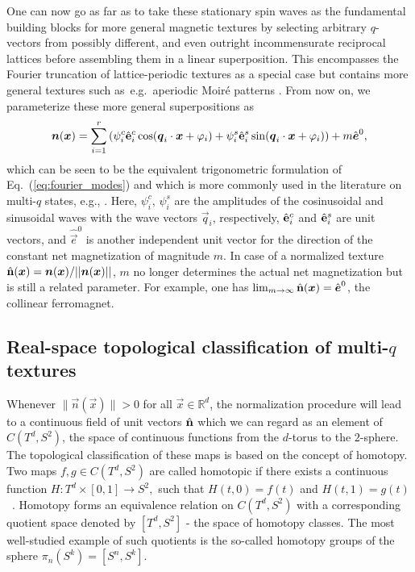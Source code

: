 \documentclass[submission, Phys]{SciPost}
\begin{document}
One can now go as far as to take these stationary spin waves as the fundamental building blocks for more general magnetic textures by selecting arbitrary $q$-vectors from possibly different, and even outright incommensurate reciprocal lattices before assembling them in a linear superposition.
This encompasses the Fourier truncation of lattice-periodic textures as a special case but contains more general textures such as~e.g.~aperiodic Moir\'e patterns \cite{Shimizu2021}.
From now on, we parameterize these more general superpositions as
\begin{equation}
    \boldsymbol{n}(\boldsymbol{x})=\sum_{i=1}^r \left(\psi_i^c \hat{\mathbf{e}}_i^c \cos(\boldsymbol{q}_i\cdot\boldsymbol{x}+\varphi_i) + \psi_i^s \hat{\mathbf{e}}_i^s \sin(\boldsymbol{q}_i\cdot\boldsymbol{x}+\varphi_i) \right) + m \hat{\boldsymbol{e}}^0,
\label{eq:superposition}
\end{equation}
which can be seen to be the equivalent trigonometric formulation of Eq.~(\ref{eq:fourier_modes}) and which is more commonly used in the literature on multi-$q$ states, e.g., \cite{Shimizu2021,Shimizu2022, Nakazawa2019, Freimuth2013}.
Here, $\psi_i^c$, $\psi_i^s$ are the amplitudes of the cosinusoidal and sinusoidal waves with the wave vectors $\vec{q}_i$, respectively, $\hat{\mathbf{e}}_i^c$ and $\hat{\mathbf{e}}_i^s$ are unit vectors, and $\hat{\vec{e}}^0$ is another independent unit vector for the direction of the constant net magnetization of magnitude $m$. In case of a normalized texture $\hat{\mathbf{n}}(\boldsymbol{x})=\boldsymbol{n}(\boldsymbol{x})/||\boldsymbol{n}(\boldsymbol{x})||$, $m$ no longer determines the actual net magnetization but is still a related parameter. For example, one has $\lim_{m\to\infty} \hat{\mathbf{n}}(\boldsymbol{x}) = \hat{\boldsymbol{e}}^0$, the collinear ferromagnet.

\subsection{Real-space topological classification of multi-\texorpdfstring{$q$}{q} textures}
\label{subsec:real_space_classification}

Whenever $\| \vec{n}(\vec{x}) \| > 0 $ for all $\vec{x} \in \mathbb{R}^d$, the normalization procedure will lead to a continuous field of unit vectors $\hat{\mathbf{n}}$ which we can regard as an element of $C(T^d, S^2)$, the space of continuous functions from the $d$-torus to the $2$-sphere. 
The topological classification of these maps is based on the concept of homotopy.
Two maps $f,g \in C(T^d, S^2)$ are called homotopic if there exists a continuous function
$
    H\colon T^d\times [0,1] \to S^2,
$
such that $H(t,0) = f(t)$ and $H(t,1)=g(t)$~\cite[Ch.~7]{Lee2010}. Homotopy forms an equivalence relation on $C(T^d, S^2)$ with a corresponding quotient space denoted by $[T^d, S^2]$ - the space of homotopy classes.
The most well-studied example of such quotients is the so-called homotopy groups of the sphere $\pi_n(S^k) = [S^n, S^k]$.
\end{document}
